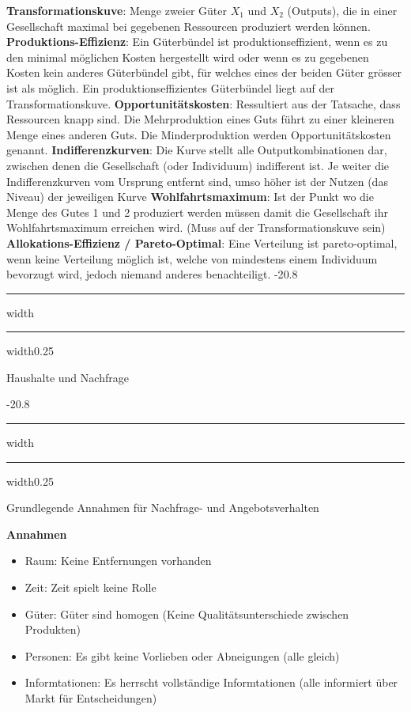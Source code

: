 \documentclass[9pt, landscape, fleqn]{scrartcl}
\makeatletter
\renewcommand{\section}{\@startsection{section}{1}{0mm}%
{-2\baselineskip}{0.8\baselineskip}%
{\hrule depth 0.2pt width\columnwidth\hrule depth1.5pt
width0.25\columnwidth\vspace*{1.2em}\Large\bfseries\rmfamily}}
\renewcommand{\subsection}{\@startsection{subsection}{1}{0mm}%
{-2\baselineskip}{0.8\baselineskip}%
{\hrule depth 0.2pt width\columnwidth\hrule depth0.75pt
width0.25\columnwidth\vspace*{1.2em}\large\bfseries\rmfamily}}
\makeatother
\begin{document}
\begin{multicols*}{3}
\textbf{Transformationskuve}: Menge zweier Güter $X_1$ und $X_2$ (Outputs), die in einer Gesellschaft maximal bei gegebenen Ressourcen produziert werden können. \newline \newline
\textbf{Produktions-Effizienz}: Ein Güterbündel ist produktionseffizient, wenn es zu den minimal möglichen Kosten hergestellt wird oder wenn es zu gegebenen Kosten kein anderes Güterbündel gibt, für welches eines der beiden Güter grösser ist als möglich. Ein produktionseffizientes Güterbündel liegt auf der Transformationskuve. \newline \newline 
\textbf{Opportunitätskosten}: Ressultiert aus der Tatsache, dass Ressourcen knapp sind. Die Mehrproduktion eines Guts führt zu einer kleineren Menge eines anderen Guts. Die Minderproduktion werden Opportunitätskosten genannt. \newline \newline
\textbf{Indifferenzkurven}: Die Kurve stellt alle Outputkombinationen dar, zwischen denen die Gesellschaft (oder Individuum) indifferent ist. Je weiter die Indifferenzkurven vom Ursprung entfernt sind, umso höher ist der Nutzen (das Niveau) der jeweiligen Kurve \newline \newline
\textbf{Wohlfahrtsmaximum}: Ist der Punkt wo die Menge des Gutes 1 und 2 produziert werden müssen damit die Gesellschaft ihr Wohlfahrtsmaximum erreichen wird. (Muss auf der Transformationskuve sein) \newline \newline
\textbf{Allokations-Effizienz / Pareto-Optimal}: Eine Verteilung ist pareto-optimal, wenn keine Verteilung möglich ist, welche von mindestens einem Individuum bevorzugt wird, jedoch niemand anderes benachteiligt.  
\section{Haushalte und Nachfrage}

\subsection{Grundlegende Annahmen für Nachfrage- und Angebotsverhalten}

\textbf{Annahmen}
\begin{itemize}
    \item Raum: Keine Entfernungen vorhanden 
    \item Zeit: Zeit spielt keine Rolle 
    \item Güter: Güter sind homogen (Keine Qualitätsunterschiede zwischen Produkten)
    \item Personen: Es gibt keine Vorlieben oder Abneigungen (alle gleich)
    \item Informtationen: Es herrscht vollständige Informtationen (alle informiert über Markt für Entscheidungen)
\end{itemize}


\end{multicols*}
\end{document}
